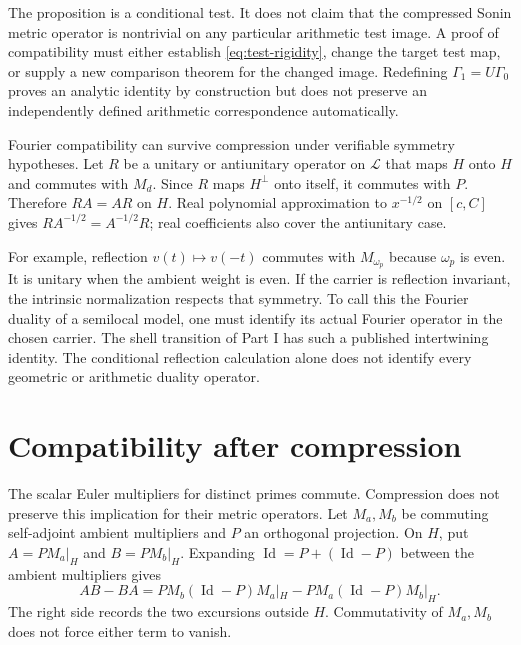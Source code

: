 \documentclass[11pt,letterpaper]{article}
\theoremstyle{definition}
\theoremstyle{remark}
\newcommand{\Id}{\operatorname{Id}}
\begin{document}
The proposition is a conditional test. It does not claim that
the compressed Sonin metric operator is nontrivial on any
particular arithmetic test image. A proof of compatibility
must either establish \eqref{eq:test-rigidity}, change the
target test map, or supply a new comparison theorem for the
changed image. Redefining $\Gamma_1=U\Gamma_0$ proves an
analytic identity by construction but does not preserve an
independently defined arithmetic correspondence automatically.

Fourier compatibility can survive compression under verifiable
symmetry hypotheses. Let $R$ be a unitary or antiunitary
operator on $\mathcal L$ that maps $H$ onto $H$ and commutes with
$M_d$. Since $R$ maps $H^\perp$ onto itself, it commutes with
$P$. Therefore $RA=AR$ on $H$. Real polynomial approximation
to $x^{-1/2}$ on $[c,C]$ gives $RA^{-1/2}=A^{-1/2}R$;
real coefficients also cover the antiunitary case.

For example, reflection $v(t)\mapsto v(-t)$ commutes with
$M_{\omega_p}$ because $\omega_p$ is even. It is unitary when the
ambient weight is even. If the carrier is reflection invariant,
the intrinsic normalization respects that symmetry. To call
this the Fourier duality of a semilocal model, one must identify
its actual Fourier operator in the chosen carrier. The shell
transition of Part I has such a published intertwining identity.
The conditional reflection calculation alone does not identify
every geometric or arithmetic duality operator.

\section{Compatibility after compression}
\label{sec:prime-compatibility}

The scalar Euler multipliers for distinct primes commute.
Compression does not preserve this implication for their
metric operators. Let $M_a,M_b$ be commuting self-adjoint
ambient multipliers and $P$ an orthogonal projection. On $H$,
put $A=PM_a|_H$ and $B=PM_b|_H$. Expanding $\Id=P+(\Id-P)$
between the ambient multipliers gives
\begin{equation}
 AB-BA=PM_b(\Id-P)M_a|_H-PM_a(\Id-P)M_b|_H.
 \label{eq:compression-commutator}
\end{equation}
The right side records the two excursions outside $H$.
Commutativity of $M_a,M_b$ does not force either term to vanish.
\end{document}
